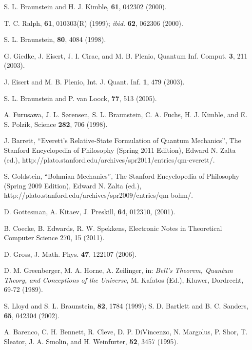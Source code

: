 \documentclass[pra,superscriptaddress,nofootinbib,12pt]{revtex4-2}
\begin{document}
\begin{thebibliography}{9}

 S. L. Braunstein and H. J. Kimble, \pra \textbf{61}, 042302 (2000).


 T. C. Ralph, \pra \textbf{61}, 010303(R) (1999); \textit{ibid.} \textbf{62}, 062306 (2000).



 S. L. Braunstein, \prl \textbf{80}, 4084 (1998).



 G. Giedke, J. Eisert, J. I. Cirac, and M. B. Plenio, Quantum Inf. Comput. \textbf{3}, 211 (2003).

 J. Eisert and M. B. Plenio, Int. J. Quant. Inf. \textbf{1}, 479 (2003).


 S. L. Braunstein and P. van Loock, \rmp \textbf{77}, 513 (2005).

 A. Furusawa, J. L. S{\o}rensen, S. L. Braunstein, C. A. Fuchs, H. J. Kimble, and E. S. Polzik, Science \textbf{282}, 706 (1998).

 J. Barrett, ``Everett's Relative-State Formulation of Quantum Mechanics'', The Stanford Encyclopedia of Philosophy (Spring 2011 Edition), Edward N. Zalta (ed.), http://plato.stanford.edu/archives/spr2011/entries/qm-everett/.

 S. Goldstein, ``Bohmian Mechanics'', The Stanford Encyclopedia of Philosophy (Spring 2009 Edition), Edward N. Zalta (ed.), http://plato.stanford.edu/archives/spr2009/entries/qm-bohm/.


 D. Gottesman, A. Kitaev, J. Preskill, \pra \textbf{64}, 012310, (2001).

	B. Coecke, B. Edwards, R. W. Spekkens, Electronic Notes in Theoretical Computer Science 270, 15 (2011).

 D. Gross, J. Math. Phys. \textbf{47}, 122107 (2006).

 D. M. Greenberger, M. A. Horne, A. Zeilinger, in: \emph{Bell's Theorem, Quantum Theory, and Conceptions of the Universe}, M. Kafatos (Ed.), Kluwer, Dordrecht, 69-72 (1989).

 S. Lloyd and S. L. Braunstein, \prl \textbf{82}, 1784 (1999); S. D. Bartlett and B. C. Sanders, \pra \textbf{65}, 042304 (2002).


 A. Barenco, C. H. Bennett, R. Cleve, D. P. DiVincenzo, N. Margolus, P. Shor, T. Sleator, J. A. Smolin, and H. Weinfurter, \pra \textbf{52}, 3457 (1995).

\end{thebibliography}
\end{document}
